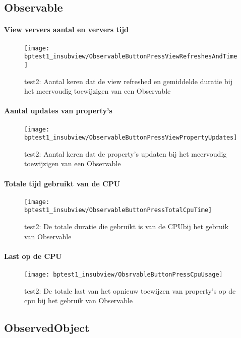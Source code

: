 \subsection{Observable}
\paragraph{View ververs aantal en ververs tijd}
\begin{figure}[H]
    \centering
    \texttt{[image: bptest1\_insubview/ObservableButtonPressViewRefreshesAndTime]} 
    \caption{test2: Aantal keren dat de view refreshed en gemiddelde duratie bij het meervoudig toewijzigen van een Observable}
    \label{fig:viewRefreshesObservable1}
\end{figure}
\paragraph{Aantal updates van property's}
\begin{figure}[H]
    \centering
    \texttt{[image: bptest1\_insubview/ObservableButtonPressViewPropertyUpdates]} 
    \caption{test2: Aantal keren dat de property's updaten bij het meervoudig toewijzigen van een Observable}
    \label{fig:propertyUpdatesObservable1}
\end{figure}
\paragraph{Totale tijd gebruikt van de CPU}
\begin{figure}[H]
    \centering
    \texttt{[image: bptest1\_insubview/ObservableButtonPressTotalCpuTime]} 
    \caption{test2: De totale duratie die gebruikt is van de CPUbij het gebruik van Observable}
    \label{fig:cpuUsageTimeObservable1}
\end{figure}
\paragraph{Last op de CPU}
\begin{figure}[H]
    \centering
    \texttt{[image: bptest1\_insubview/ObsrvableButtonPressCpuUsage]} 
    \caption{test2: De totale last van het opnieuw toewijzen van property's op de cpu bij het gebruik van Observable}
    \label{fig:cpuWeightObservable1}
\end{figure}

\subsection{ObservedObject}
